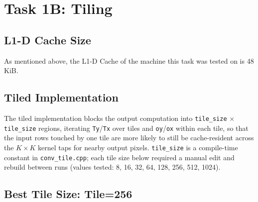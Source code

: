 \documentclass[11pt]{article}
\begin{document}
\section{Task 1B: Tiling}
\subsection{L1-D Cache Size}
As mentioned above, the L1-D Cache of the machine this task was tested on is 48 KiB.

\subsection{Tiled Implementation}
The tiled implementation blocks the output computation into \texttt{tile\_size} $\times$ \texttt{tile\_size} regions, iterating \texttt{Ty}/\texttt{Tx} over tiles and \texttt{oy}/\texttt{ox} within each tile, so that the input rows touched by one tile are more likely to still be cache-resident across the $K \times K$ kernel taps for nearby output pixels. \texttt{tile\_size} is a compile-time constant in \texttt{conv\_tile.cpp}; each tile size below required a manual edit and rebuild between runs (values tested: 8, 16, 32, 64, 128, 256, 512, 1024).

\subsection{Best Tile Size: Tile=256}
\begin{table}[H]
  \centering
  \caption{Tile Size = 256}
  \label{tab:tile_tileSize256}
\end{table}
\end{document}
